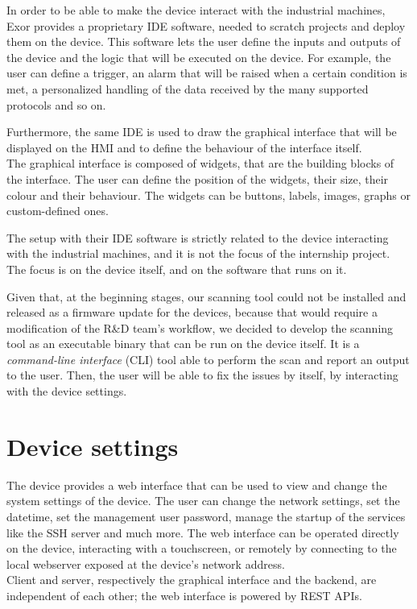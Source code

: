 In order to be able to make the device interact with the industrial machines, Exor provides a proprietary IDE software, needed to scratch projects and deploy them on the device. This software lets the user define the inputs and outputs of the device and the logic that will be executed on the device. For example, the user can define a trigger, an alarm that will be raised when a certain condition is met, a personalized handling of the data received by the many supported protocols and so on.

Furthermore, the same IDE is used to draw the graphical interface that will be displayed on the HMI and to define the behaviour of the interface itself.\\
The graphical interface is composed of widgets, that are the building blocks of the interface. The user can define the position of the widgets, their size, their colour and their behaviour. The widgets can be buttons, labels, images, graphs or custom-defined ones.

The setup with their IDE software is strictly related to the device interacting with the industrial machines, and it is not the focus of the internship project. The focus is on the device itself, and on the software that runs on it.

Given that, at the beginning stages, our scanning tool could not be installed and released as a firmware update for the devices, because that would require a modification of the R\&D team's workflow, we decided to develop the scanning tool as an executable binary that can be run on the device itself. It is a \textit{command-line interface} (CLI) tool able to perform the scan and report an output to the user. Then, the user will be able to fix the issues by itself, by interacting with the device settings.

\section{Device settings}

The device provides a web interface that can be used to view and change the system settings of the device. The user can change the network settings, set the datetime, set the management user password, manage the startup of the services like the SSH server and much more. The web interface can be operated directly on the device, interacting with a touchscreen, or remotely by connecting to the local webserver exposed at the device's network address. \\
Client and server, respectively the graphical interface and the backend, are independent of each other; the web interface is powered by REST APIs.


